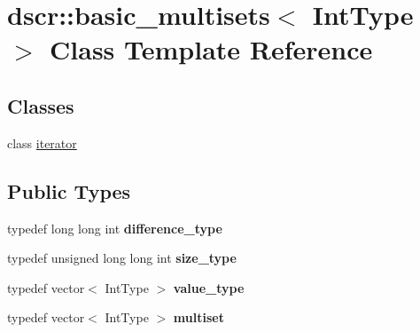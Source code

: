 \hypertarget{classdscr_1_1basic__multisets}{\section{dscr\-:\-:basic\-\_\-multisets$<$ Int\-Type $>$ Class Template Reference}
\label{classdscr_1_1basic__multisets}
}
\subsection*{Classes}
\begin{DoxyCompactItemize}
\item 
class \hyperlink{classdscr_1_1basic__multisets_1_1iterator}{iterator}
\end{DoxyCompactItemize}
\subsection*{Public Types}
\begin{DoxyCompactItemize}
\item 
\hypertarget{classdscr_1_1basic__multisets_aaed168928e104d3c824a5e53c46feb36}{typedef long long int {\bfseries difference\-\_\-type}}\label{classdscr_1_1basic__multisets_aaed168928e104d3c824a5e53c46feb36}

\item 
\hypertarget{classdscr_1_1basic__multisets_a15698d5727002a0613c62128d81e6e10}{typedef unsigned long long int {\bfseries size\-\_\-type}}\label{classdscr_1_1basic__multisets_a15698d5727002a0613c62128d81e6e10}

\item 
\hypertarget{classdscr_1_1basic__multisets_a74a8a1c61251518f96e49a9f76d8eb39}{typedef vector$<$ Int\-Type $>$ {\bfseries value\-\_\-type}}\label{classdscr_1_1basic__multisets_a74a8a1c61251518f96e49a9f76d8eb39}

\item 
\hypertarget{classdscr_1_1basic__multisets_a4bb849f53fccdfb25f9a1b3c96f2be40}{typedef vector$<$ Int\-Type $>$ {\bfseries multiset}}\label{classdscr_1_1basic__multisets_a4bb849f53fccdfb25f9a1b3c96f2be40}

\end{DoxyCompactItemize}
